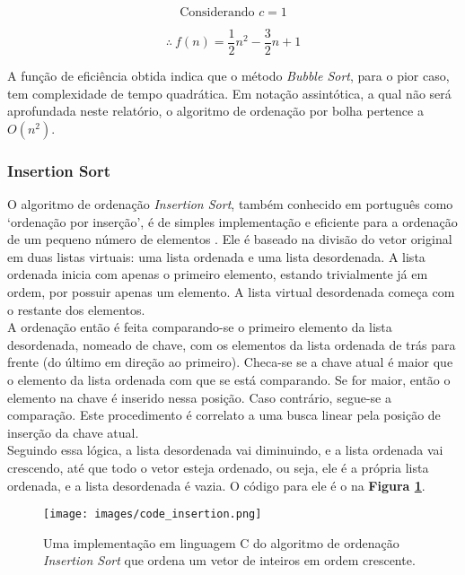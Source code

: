 \documentclass[fontsize=10pt]{article}
\begin{document}
$$ \text{Considerando $c = 1$}$$

\begin{equation} \label{eq3}
\therefore \ f(n) = \frac{1}{2} n^2 - \frac{3}{2} n + 1 
\end{equation}

A função de eficiência obtida indica que o método \textit{Bubble Sort}, para o pior caso, tem complexidade de tempo quadrática. Em notação assintótica, a qual não será aprofundada neste relatório, o algoritmo de ordenação por bolha pertence a $O(n^2)$.

\subsubsection{Insertion Sort}
\label{ins}

O algoritmo de ordenação \textit{Insertion Sort}, também conhecido em português como `ordenação por inserção', é de simples implementação e eficiente para a ordenação de um pequeno número de elementos \cite[p. 25]{cormen}. Ele é baseado na divisão do vetor original em duas listas virtuais: uma lista ordenada e uma lista desordenada. A lista ordenada inicia com apenas o primeiro elemento, estando trivialmente já em ordem, por possuir apenas um elemento. A lista virtual desordenada começa com o restante dos elementos.\\

A ordenação então é feita comparando-se o primeiro elemento da lista desordenada, nomeado de chave, com os elementos da lista ordenada de trás para frente (do último em direção ao primeiro). Checa-se se a chave atual é maior que o elemento da lista ordenada com que se está comparando. Se for maior, então o elemento na chave é inserido nessa posição. Caso contrário, segue-se a comparação. Este procedimento é correlato a uma busca linear pela posição de inserção da chave atual.\\

Seguindo essa lógica, a lista desordenada vai diminuindo, e a lista ordenada vai crescendo, até que todo o vetor esteja ordenado, ou seja, ele é a própria lista ordenada, e a lista desordenada é vazia. O código para ele é o na \textbf{Figura \ref{insertion-code}}.

\begin{figure}[H]
\centering
\texttt{[image: images/code\_insertion.png]}
\caption{Uma implementação em linguagem C do algoritmo de ordenação \textit{Insertion Sort} que ordena um vetor de inteiros em ordem crescente.}
\label{insertion-code}
\end{figure}
\end{document}
